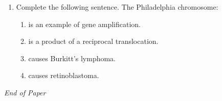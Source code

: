 \documentclass[12pt]{article}
\begin{document}
\begin{enumerate}[label=\arabic*.]
\begin{enumerate}[label=(\alph*)]
    \item hyoid bone, cricoid cartilage, thyroid cartilage.
    \item thyroid cartilage, cricoid cartilage, hyoid bone.
    \item hyoid bone, thyroid cartilage, cricoid cartilage.
    \item thyroid cartilage, hyoid bone, cricoids cartilage.
\end{enumerate}
\item Complete the following sentence. The Philadelphia chromosome:
\begin{enumerate}[label=(\alph*)]
    \item is an example of gene amplification.
    \item is a product of a reciprocal translocation.
    \item causes Burkitt's lymphoma.
    \item causes retinoblastoma.
\end{enumerate}
\end{enumerate}

\vfill
\noindent\textit{End of Paper}
\end{document}
